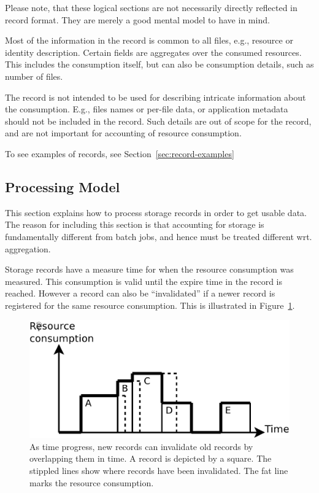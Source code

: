 Please note, that these logical sections are not necessarily directly reflected
in record format. They are merely a good mental model to have in mind.

Most of the information in the record is common to all files, e.g., resource or
identity description. Certain fields are aggregates over the consumed
resources. This includes the consumption itself, but can also be consumption
details, such as number of files.

The record is not intended to be used for describing intricate information
about the consumption. E.g., files names or per-file data, or application
metadata should not be included in the record. Such details are out of scope
for the record, and are not important for accounting of resource consumption.

To see examples of records, see Section~\ref{sec:record-examples}


\subsection{Processing Model}

This section explains how to process storage records in order to get usable
data. The reason for including this section is that accounting for storage is
fundamentally different from batch jobs, and hence must be treated different
wrt. aggregation.

Storage records have a measure time for when the resource consumption was
measured. This consumption is valid until the expire time in the record is
reached. However a record can also be ``invalidated'' if a newer record is
registered for the same resource consumption. This is illustrated in
Figure~\ref{fig:consumptionprogress}.

\begin{figure}[htb]
  \begin{center}
    \includegraphics[width=14cm]{figures/consumptionprogress}
    \caption{As time progress, new records can invalidate old records by
    overlapping them in time. A record is depicted by a square. The stippled
    lines show where records have been invalidated. The fat line marks the
    resource consumption.}
    \label{fig:consumptionprogress}
  \end{center}
\end{figure}

